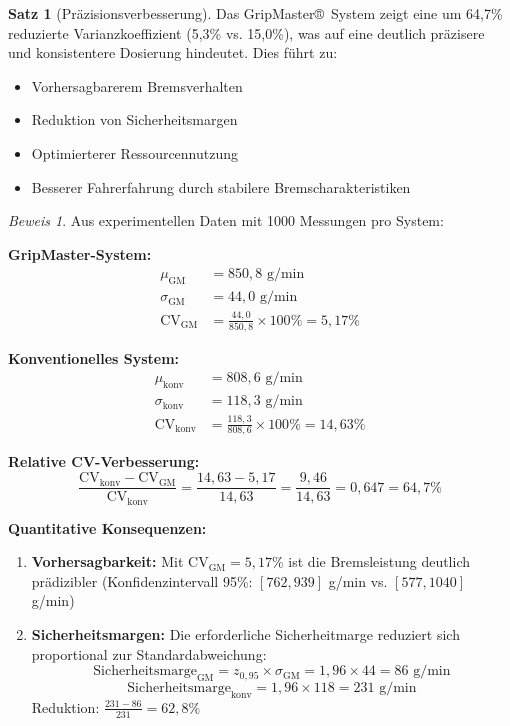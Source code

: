 \documentclass[a4paper,12pt]{article}
\theoremstyle{definition}
\newtheorem{satz}{Satz}
\theoremstyle{remark}
\newtheorem*{beweis}{Beweis}
\begin{document}
\begin{satz}[Präzisionsverbesserung]
	Das GripMaster®~System zeigt eine um 64,7\% reduzierte Varianzkoeffizient (5,3\% vs. 15,0\%), 
	was auf eine deutlich präzisere und konsistentere Dosierung hindeutet. Dies führt zu:
	\begin{itemize}
		\item Vorhersagbarerem Bremsverhalten
		\item Reduktion von Sicherheitsmargen
		\item Optimierterer Ressourcennutzung
		\item Besserer Fahrerfahrung durch stabilere Bremscharakteristiken
	\end{itemize}
\end{satz}


\begin{beweis}
Aus experimentellen Daten mit 1000 Messungen pro System:

\textbf{GripMaster-System:}
\begin{align*}
\mu_{\text{GM}} &= 850,8 \text{ g/min} \\
\sigma_{\text{GM}} &= 44,0 \text{ g/min} \\
\text{CV}_{\text{GM}} &= \frac{44,0}{850,8} \times 100\% = 5,17\%
\end{align*}

\textbf{Konventionelles System:}
\begin{align*}
\mu_{\text{konv}} &= 808,6 \text{ g/min} \\
\sigma_{\text{konv}} &= 118,3 \text{ g/min} \\
\text{CV}_{\text{konv}} &= \frac{118,3}{808,6} \times 100\% = 14,63\%
\end{align*}

\textbf{Relative CV-Verbesserung:}
\[\frac{\text{CV}_{\text{konv}} - \text{CV}_{\text{GM}}}{\text{CV}_{\text{konv}}} = \frac{14,63 - 5,17}{14,63} = \frac{9,46}{14,63} = 0,647 = 64,7\%\]

\textbf{Quantitative Konsequenzen:}
\begin{enumerate}
\item \textbf{Vorhersagbarkeit:} Mit $\text{CV}_{\text{GM}} = 5,17\%$ ist die Bremsleistung deutlich prädizibler (Konfidenzintervall 95\%: $[762, 939]$ g/min vs. $[577, 1040]$ g/min)

\item \textbf{Sicherheitsmargen:} Die erforderliche Sicherheitmarge reduziert sich proportional zur Standardabweichung:
\[\text{Sicherheitsmarge}_{\text{GM}} = z_{0,95} \times \sigma_{\text{GM}} = 1,96 \times 44 = 86 \text{ g/min}\]
\[\text{Sicherheitsmarge}_{\text{konv}} = 1,96 \times 118 = 231 \text{ g/min}\]
Reduktion: $\frac{231-86}{231} = 62,8\%$


\end{enumerate}
\end{beweis}
\end{document}
